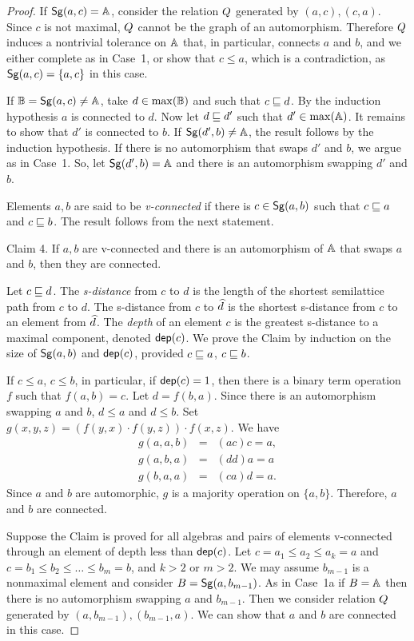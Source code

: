 \documentclass[11pt]{article}
\begin{document}
\begin{proof}
If ${\sf Sg}(a,c)={\mathbb A}$, consider the relation $Q$ generated by $(a,c),(c,a)$. Since $c$ 
is not maximal, $Q$ cannot be the graph of an automorphism. Therefore $Q$ 
induces a nontrivial tolerance on ${\mathbb A}$ that, in particular, connects $a$ and $b$, and 
we either complete as in Case~1, or show that $c\le a$, which is a contradiction, as 
${\sf Sg}(a,c)=\{a,c\}$ in this case.

If ${\mathbb B}={\sf Sg}(a,c)\ne{\mathbb A}$, take $d\in\max({\mathbb B})$ and such that $c\sqsubseteq d$. By the 
induction hypothesis $a$ is connected to $d$. Now let $d\sqsubseteq d'$ such that 
$d'\in\max({\mathbb A})$. It remains to show that $d'$ is connected to $b$. If 
${\sf Sg}(d',b)\ne{\mathbb A}$, the result follows by the induction hypothesis. If there 
is no automorphism that swaps $d'$ and $b$, we argue as in Case~1. So, let 
${\sf Sg}(d',b)={\mathbb A}$ and there is an automorphism swapping $d'$ and $b$.

Elements $a,b$ are said to be \emph{v-connected} if there is $c\in{\sf Sg}(a,b)$ such 
that $c\sqsubseteq a$ and $c\sqsubseteq b$. The result follows from the next statement.

\smallskip

{\sc Claim 4.}
If $a,b$ are v-connected and there is an automorphism of ${\mathbb A}$ that swaps $a$ 
and $b$, then they are connected.

\smallskip

Let $c\sqsubseteq d$. The \emph{s-distance} from $c$ to $d$ is the length of the 
shortest semilattice path from $c$ to $d$. The s-distance from $c$ to $\widehat d$ is 
the shortest s-distance from $c$ to an element from $\widehat d$. The \emph{depth} 
of an element $c$ is the greatest s-distance to a maximal  
component, denoted $\mathsf{dep}(c)$. We prove the Claim by induction on the size of 
${\sf Sg}(a,b)$ and $\mathsf{dep}(c)$, provided $c\sqsubseteq a$, $c\sqsubseteq b$.

If $c\le a$, $c\le b$, in particular, if $\mathsf{dep}(c)=1$, then there is a binary term 
operation $f$ such that $f(a,b)=c$. Let $d=f(b,a)$. Since there is an automorphism 
swapping $a$ and $b$, $d\le a$ and $d\le b$. 
Set $g(x,y,z)=(f(y,x)\cdot f(y,z))\cdot f(x,z)$. We have
\begin{eqnarray*}
g(a,a,b) &=& (ac)c=a,\\
g(a,b,a) &=& (dd)a=a\\
g(b,a,a) &=& (ca)d=a.
\end{eqnarray*}
Since $a$ and $b$ are automorphic, $g$ is a majority operation on $\{a,b\}$. 
Therefore, $a$ and $b$ are connected.


Suppose the Claim is proved for all algebras and pairs of elements v-connected 
through an element of depth less than $\mathsf{dep}(c)$. Let $c=a_1\le a_2\le a_k=a$ 
and $c=b_1\le b_2\le\ldots\le b_m=b$, and $k>2$ or $m>2$. We may assume 
$b_{m-1}$ is a nonmaximal element and consider $B={\sf Sg}(a,b_{m-1})$. As in 
Case~1a if $B={\mathbb A}$ then there is no automorphism swapping $a$ 
and $b_{m-1}$. Then we consider relation $Q$ generated by 
$(a,b_{m-1}),(b_{m-1},a)$. We can show that $a$ and $b$ are connected in this case.  


\end{proof}
\end{document}
